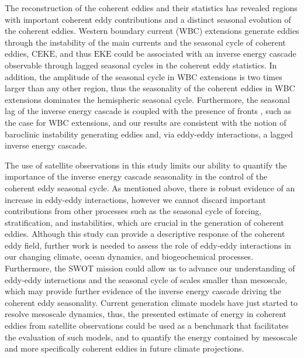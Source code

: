 \documentclass[draft,linenumbers]{agujournal2019}
\newcommand{\EKE}{\textrm{EKE}}
\newcommand{\CEKE}{\textrm{CEKE}}
\begin{document}
	The reconstruction of the coherent eddies and their statistics has revealed regions with important coherent eddy contributions and a distinct seasonal evolution of the coherent eddies. 
	Western boundary current (WBC) extensions generate eddies through the instability of the main currents and the seasonal cycle of coherent eddies, $\CEKE$, and thus $\EKE$ could be associated with an inverse energy cascade observable through lagged seasonal cycles in the coherent eddy statistics. 
	In addition, the amplitude of the seasonal cycle in WBC extensions is two times larger than any other region, thus the seasonality of the coherent eddies in WBC extensions dominates the hemispheric seasonal cycle. 
	Furthermore, the seasonal lag of the inverse energy cascade is coupled with the presence of fronts \citep{Qiu_seasonal_2014}, such as the case for WBC extensions, and our results are consistent with the notion of baroclinic instability generating eddies and, via eddy-eddy interactions, a lagged inverse energy cascade.
	
	The use of satellite observations in this study limits our ability to quantify the importance of the inverse energy cascade seasonality in the control of the coherent eddy seasonal cycle. 
	As mentioned above, there is robust evidence of an increase in eddy-eddy interactions, however we cannot discard important contributions from other processes such as the seasonal cycle of forcing, stratification, and instabilities, which are crucial in the generation of coherent eddies. Although this study can provide a descriptive response of the coherent eddy field, further work is needed to assess the role of eddy-eddy interactions in our changing climate, ocean dynamics, and biogeochemical processes. Furthermore, the SWOT mission could allow us to advance our understanding of eddy-eddy interactions and the seasonal cycle of scales smaller than mesoscale, which may provide further evidence of the inverse energy cascade driving the coherent eddy seasonality. Current generation climate models have just started to resolve mesoscale dynamics, thus, the presented estimate of energy in coherent eddies from satellite observations could be used as a benchmark that facilitates the evaluation of such models, and to quantify the energy contained by mesoscale and more specifically coherent eddies in future climate projections.
\end{document}
